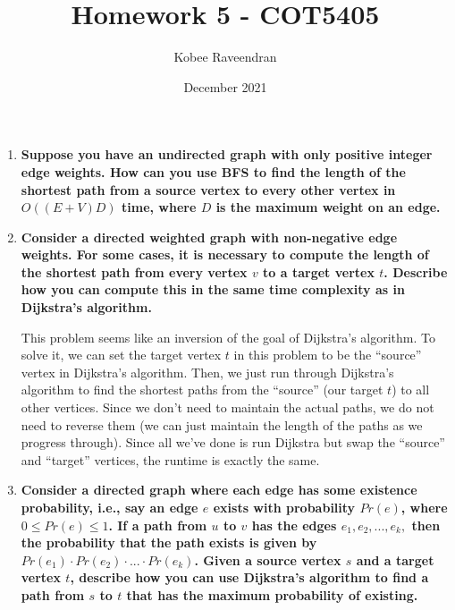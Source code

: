 \documentclass[12pt]{article}
\title{Homework 5 - COT5405}
\author{Kobee Raveendran}
\date{December 2021}
\begin{document}
    \maketitle

    \begin{enumerate}
        \item \textbf{Suppose you have an undirected graph with only positive integer edge weights. How can you use BFS to find 
        the length of the shortest path from a source vertex to every other vertex in $O((E+V)D)$ time, where $D$ is the 
        maximum weight on an edge.}

        \item \textbf{Consider a directed weighted graph with non-negative edge weights. For some cases, it is necessary 
        to compute the length of the shortest path from every vertex $v$ to a target vertex $t$. Describe how you can 
        compute this in the same time complexity as in Dijkstra's algorithm.}

        This problem seems like an inversion of the goal of Dijkstra's algorithm. To solve it, we can set the 
        target vertex $t$ in this problem to be the ``source'' vertex in Dijkstra's algorithm. Then, we just run through 
        Dijkstra's algorithm to find the shortest paths from the ``source'' (our target $t$) to all other vertices. 
        Since we don't need to maintain the actual paths, we do not need to reverse them (we can just maintain the length 
        of the paths as we progress through). Since all we've done is run Dijkstra but swap the ``source'' and ``target'' 
        vertices, the runtime is exactly the same.

        \item \textbf{Consider a directed graph where each edge has some existence probability, i.e., say an edge $e$ 
        exists with probability $Pr(e)$, where $0 \leq Pr(e) \leq 1$. If a path from $u$ to $v$ has the edges 
        $e_1, e_2, ..., e_k, $ then the probability that the path exists is given by $Pr(e_1) \cdot Pr(e_2) \cdot ... 
        \cdot Pr(e_k)$. Given a source vertex $s$ and a target vertex $t$, describe how you can use Dijkstra's algorithm 
        to find a path from $s$ to $t$ that has the maximum probability of existing.}


\end{enumerate}
\end{document}
